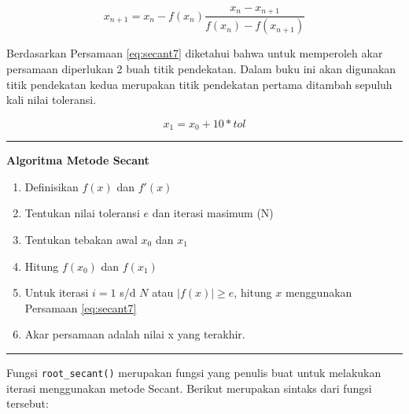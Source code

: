 \documentclass[
]{book}
\providecommand{\tightlist}{%
  \setlength{\itemsep}{0pt}\setlength{\parskip}{0pt}}
\theoremstyle{definition}
\theoremstyle{definition}
\theoremstyle{definition}
\theoremstyle{definition}
\theoremstyle{remark}
\begin{document}
\begin{equation}
x_{n+1}=x_n-f\left(x_n\right)\frac{x_n-x_{n+1}}{f\left(x_n\right)-f\left(x_{n+1}\right)}
  \label{eq:secant7}
\end{equation}

Berdasarkan Persamaan \eqref{eq:secant7} diketahui bahwa untuk memperoleh akar persamaan diperlukan 2 buah titik pendekatan. Dalam buku ini akan digunakan titik pendekatan kedua merupakan titik pendekatan pertama ditambah sepuluh kali nilai toleransi.

\begin{equation}
x_1=x_0+10*tol
  \label{eq:secant8}
\end{equation}

\begin{center}\rule{0.5\linewidth}{0.5pt}\end{center}

\textbf{Algoritma Metode Secant}

\begin{enumerate}
\def\labelenumi{\arabic{enumi}.}
\tightlist
\item
  Definisikan \(f\left(x \right)\) dan \(f'\left(x \right)\)
\item
  Tentukan nilai toleransi \(e\) dan iterasi masimum (N)
\item
  Tentukan tebakan awal \(x_0\) dan \(x_1\)
\item
  Hitung \(f\left(x_0 \right)\) dan \(f\left(x_1 \right)\)
\item
  Untuk iterasi \(i=1\) s/d \(N\) atau \(\left|f\left(x \right) \right|\ge e\), hitung \(x\) menggunakan Persamaan \eqref{eq:secant7}
\item
  Akar persamaan adalah nilai x yang terakhir.
\end{enumerate}

\begin{center}\rule{0.5\linewidth}{0.5pt}\end{center}

Fungsi \texttt{root\_secant()} merupakan fungsi yang penulis buat untuk melakukan iterasi menggunakan metode Secant. Berikut merupakan sintaks dari fungsi tersebut:
\end{document}
